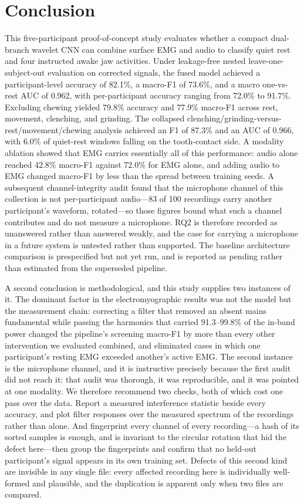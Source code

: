 \documentclass[pdflatex,sn-nature,iicol]{sn-jnl}
\begin{document}
\section{Conclusion}

This five-participant proof-of-concept study evaluates whether a compact dual-branch wavelet CNN can combine surface EMG and audio to classify quiet rest and four instructed awake jaw activities. Under leakage-free nested leave-one-subject-out evaluation on corrected signals, the fused model achieved a participant-level accuracy of 82.1\%, a macro-F1 of 73.6\%, and a macro one-vs-rest AUC of 0.962, with per-participant accuracy ranging from 72.0\% to 91.7\%. Excluding chewing yielded 79.8\% accuracy and 77.9\% macro-F1 across rest, movement, clenching, and grinding. The collapsed clenching/grinding-versus-rest/movement/chewing analysis achieved an F1 of 87.3\% and an AUC of 0.966, with 6.0\% of quiet-rest windows falling on the tooth-contact side. A modality ablation showed that EMG carries essentially all of this performance: audio alone reached 42.8\% macro-F1 against 72.0\% for EMG alone, and adding audio to EMG changed macro-F1 by less than the spread between training seeds. A subsequent channel-integrity audit found that the microphone channel of this collection is not per-participant audio---83 of 100 recordings carry another participant's waveform, rotated---so those figures bound what such a channel contributes and do not measure a microphone. RQ2 is therefore recorded as unanswered rather than answered weakly, and the case for carrying a microphone in a future system is untested rather than supported. The baseline architecture comparison is prespecified but not yet run, and is reported as pending rather than estimated from the superseded pipeline.

A second conclusion is methodological, and this study supplies two instances of it. The dominant factor in the electromyographic results was not the model but the measurement chain: correcting a filter that removed an absent mains fundamental while passing the harmonics that carried 91.3--99.8\% of the in-band power changed the pipeline's screening macro-F1 by more than every other intervention we evaluated combined, and eliminated cases in which one participant's resting EMG exceeded another's active EMG. The second instance is the microphone channel, and it is instructive precisely because the first audit did not reach it: that audit was thorough, it was reproducible, and it was pointed at one modality. We therefore recommend two checks, both of which cost one pass over the data. Report a measured interference statistic beside every accuracy, and plot filter responses over the measured spectrum of the recordings rather than alone. And fingerprint every channel of every recording---a hash of its sorted samples is enough, and is invariant to the circular rotation that hid the defect here---then group the fingerprints and confirm that no held-out participant's signal appears in its own training set. Defects of this second kind are invisible in any single file: every affected recording here is individually well-formed and plausible, and the duplication is apparent only when two files are compared.
\end{document}
